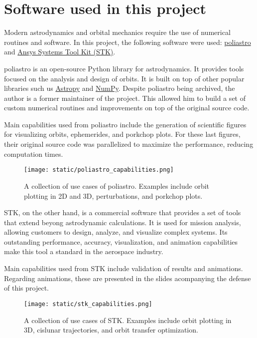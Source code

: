 \section{Software used in this project}

Modern astrodynamics and orbital mechanics require the use of numerical routines
and software. In this project, the following software were used:
\href{https://github.com/poliastro/poliastro}{poliastro} and
\href{https://www.ansys.com/products/missions/ansys-stk}{Ansys Systems Tool Kit
(STK)}.

poliastro is an open-source Python library for astrodynamics. It provides tools
focused on the analysis and design of orbits. It is built on top of other
popular libraries such us \href{https://github.com/astropy/astropy}{Astropy} and
\href{https://github.com/numpy/numpy}{NumPy}. Despite poliastro being archived,
the author is a former maintainer of the project. This allowed him to build a
set of custom numerical routines and improvements on top of the original source
code.

Main capabilities used from poliastro include the generation of scientific
figures for visualizing orbits, ephemerides, and porkchop plots. For these last
figures, their original source code was parallelized to maximize the
performance, reducing computation times.

\vspace{1cm}
\begin{figure}[H] \centering
        \texttt{[image: static/poliastro\_capabilities.png]}
        \caption[A collection of use cases of poliastro.]{A collection of use
        cases of poliastro. Examples include orbit plotting in 2D and 3D,
        perturbations, and porkchop plots.} 
        \label{fig:poliastro_capabilities}
\end{figure}

STK, on the other hand, is a commercial software that provides a set of tools
that extend beyong astrodynamic calculations. It is used for mission analysis,
allowing customers to design, analyze, and visualize complex systems. Its
outstanding performance, accuracy, visualization, and animation capabilities
make this tool a standard in the aerospace industry.

Main capabilities used from STK include validation of results and animations.
Regarding animations, these are presented in the slides acompanying the defense
of this project.

\vspace{1cm}
\begin{figure}[H] \centering
        \texttt{[image: static/stk\_capabilities.png]}
        \caption[A collection of use cases of STK.]{A collection of use
        cases of STK. Examples include orbit plotting in 3D, cislunar
        trajectories, and orbit transfer optimization.} 
        \label{fig:stk_capabilities}
\end{figure}


